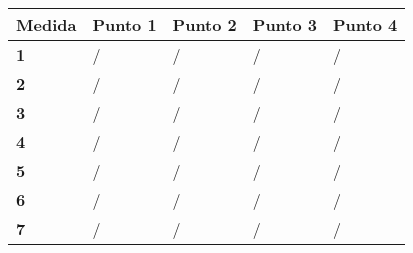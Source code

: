 \documentclass[spanish,12pt,a4paper,titlepage]{report}
\begin{document}
\begin{table}[H]
\begin{center}
\begin{tabular}{|p{40pt}|p{80pt}|p{80pt}|p{80pt}|p{80pt}|} \hline
  \cellcolor[gray]{0.8} \textbf{Medida} 
& \cellcolor[gray]{0.8} \textbf{Punto 1} 
& \cellcolor[gray]{0.8} \textbf{Punto 2} 
& \cellcolor[gray]{0.8} \textbf{Punto 3} 
& \cellcolor[gray]{0.8} \textbf{Punto 4} \\ \hline \hline
\multicolumn{1}{|p{40pt}|}{\cellcolor[gray]{0.8}\textbf{1}} & \hspace*{40pt}/& \hspace*{40pt}/& \hspace*{40pt}/& \hspace*{40pt}/\\ \hline 
\multicolumn{1}{|p{40pt}|}{\cellcolor[gray]{0.8}\textbf{2}} & \hspace*{40pt}/& \hspace*{40pt}/& \hspace*{40pt}/& \hspace*{40pt}/\\ \hline 
\multicolumn{1}{|p{40pt}|}{\cellcolor[gray]{0.8}\textbf{3}} & \hspace*{40pt}/& \hspace*{40pt}/& \hspace*{40pt}/& \hspace*{40pt}/\\ \hline
\multicolumn{1}{|p{40pt}|}{\cellcolor[gray]{0.8}\textbf{4}} & \hspace*{40pt}/& \hspace*{40pt}/& \hspace*{40pt}/& \hspace*{40pt}/\\ \hline
\multicolumn{1}{|p{40pt}|}{\cellcolor[gray]{0.8}\textbf{5}} & \hspace*{40pt}/& \hspace*{40pt}/& \hspace*{40pt}/& \hspace*{40pt}/\\ \hline
\multicolumn{1}{|p{40pt}|}{\cellcolor[gray]{0.8}\textbf{6}} & \hspace*{40pt}/& \hspace*{40pt}/& \hspace*{40pt}/& \hspace*{40pt}/\\ \hline
\multicolumn{1}{|p{40pt}|}{\cellcolor[gray]{0.8}\textbf{7}} & \hspace*{40pt}/& \hspace*{40pt}/& \hspace*{40pt}/& \hspace*{40pt}/\\ \hline

\end{tabular}
\end{center}
\end{table}
\end{document}
